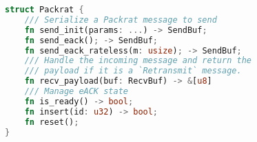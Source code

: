 \begin{lstfloat}[t]
\begin{lstlisting}[language=Rust]
struct Packrat {
    /// Serialize a Packrat message to send
    fn send_init(params: ...) -> SendBuf;
    fn send_eack(); -> SendBuf;
    fn send_eack_rateless(m: usize); -> SendBuf;
    /// Handle the incoming message and return the
    /// payload if it is a `Retransmit` message.
    fn recv_payload(buf: RecvBuf) -> &[u8]
    /// Manage eACK state
    fn is_ready() -> bool;
    fn insert(id: u32) -> bool;
    fn reset();
}
\end{lstlisting}
\vspace{-0.3cm}
\label{lst:quacker-interface}
\end{lstfloat}